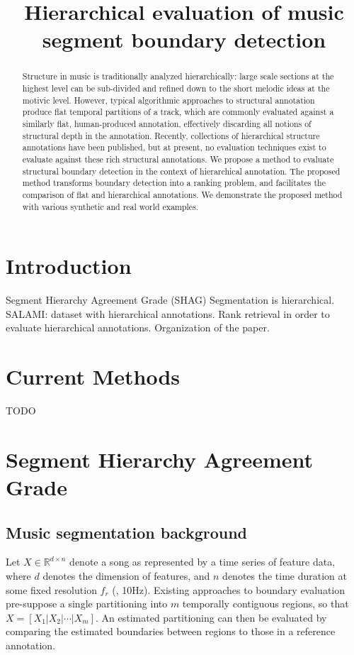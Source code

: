 \documentclass{article}
\title{Hierarchical evaluation of music segment boundary detection}
\begin{document}
%
\maketitle
%
\begin{abstract}
Structure in music is traditionally analyzed hierarchically: large scale sections at the highest level can be sub-divided and refined down to the short melodic ideas at the motivic level. 
However, typical algorithmic approaches to structural annotation produce flat temporal partitions of a track, which are commonly evaluated against a similarly flat, human-produced
annotation, effectively discarding all notions of structural depth in the annotation.
Recently, collections of hierarchical structure annotations have been published, but at present, no evaluation techniques exist to evaluate against these rich structural annotations.
We propose a method to evaluate structural boundary detection in the context of hierarchical annotation.
The proposed method transforms boundary detection into a ranking problem, and facilitates the comparison of flat and hierarchical annotations.
We demonstrate the proposed method with various synthetic and real world examples. 
\end{abstract}
%
\section{Introduction}\label{sec:introduction}

  Segment Hierarchy Agreement Grade (SHAG)
Segmentation is hierarchical.
SALAMI: dataset with hierarchical annotations.
Rank retrieval in order to evaluate hierarchical annotations.
Organization of the paper.

\section{Current Methods}

TODO

\section{Segment Hierarchy Agreement Grade}\label{sec:eval_desc}

\subsection{Music segmentation background}

Let $X \in \mathbb{R}^{d\times n}$ denote a song as represented by a time series of 
feature data, where $d$ denotes the dimension of features, and $n$ denotes the
time duration at some fixed resolution $f_r$ (\eg, 10Hz).
Existing approaches to boundary evaluation pre-suppose a single partitioning into $m$
temporally contiguous regions, so that $X=[X_1|X_2|\cdots|X_m]$.  An estimated
partitioning can then be evaluated by comparing the estimated boundaries between
regions to those in a reference annotation.
\end{document}
